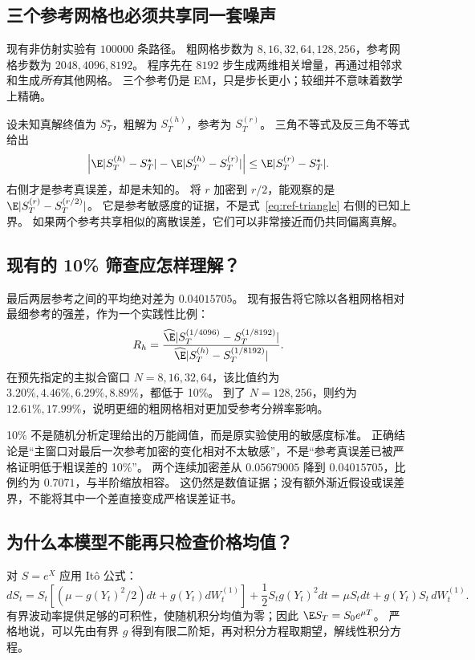 \subsection{三个参考网格也必须共享同一套噪声}
现有非仿射实验有 $100000$ 条路径。
粗网格步数为 $8,16,32,64,128,256$，参考网格步数为 $2048,4096,8192$。
程序先在 $8192$ 步生成两维相关增量，再通过相邻求和生成\emph{所有}其他网格。
三个参考仍是 EM，只是步长更小；较细并不意味着数学上精确。

设未知真解终值为 $S_T^\star$，粗解为 $S_T^{(h)}$，参考为 $S_T^{(r)}$。
三角不等式及反三角不等式给出
\begin{equation}\label{eq:ref-triangle}
 \left|\E|S_T^{(h)}-S_T^\star|-\E|S_T^{(h)}-S_T^{(r)}|\right|
 \le\E|S_T^{(r)}-S_T^\star|.
\end{equation}
右侧才是参考真误差，却是未知的。
将 $r$ 加密到 $r/2$，能观察的是 $\E|S_T^{(r)}-S_T^{(r/2)}|$。
它是参考敏感度的证据，不是式~\eqref{eq:ref-triangle} 右侧的已知上界。
如果两个参考共享相似的离散误差，它们可以非常接近而仍共同偏离真解。

\subsection{现有的 10\% 筛查应怎样理解？}
最后两层参考之间的平均绝对差为 $0.04015705$。
现有报告将它除以各粗网格相对最细参考的强差，作为一个实践性比例：
\begin{equation}\label{eq:ref-screen}
 R_h=\frac{\widehat\E|S_T^{(1/4096)}-S_T^{(1/8192)}|}
 {\widehat\E|S_T^{(h)}-S_T^{(1/8192)}|}.
\end{equation}
在预先指定的主拟合窗口 $N=8,16,32,64$，该比值约为 $3.20\%,4.46\%,6.29\%,8.89\%$，都低于 10\%。
到了 $N=128,256$，则约为 $12.61\%,17.99\%$，说明更细的粗网格相对更加受参考分辨率影响。

10\% 不是随机分析定理给出的万能阈值，而是原实验使用的敏感度标准。
正确结论是“主窗口对最后一次参考加密的变化相对不太敏感”，不是“参考真误差已被严格证明低于粗误差的 10\%”。
两个连续加密差从 $0.05679005$ 降到 $0.04015705$，比例约为 $0.7071$，与半阶缩放相容。
这仍然是数值证据；没有额外渐近假设或误差界，不能将其中一个差直接变成严格误差证书。

\subsection{为什么本模型不能再只检查价格均值？}
对 $S=e^X$ 应用 Itô 公式：
\begin{equation}\label{eq:ref-price-sde}
 dS_t=S_t\left[(\mu-g(Y_t)^2/2)dt+g(Y_t)dW_t^{(1)}\right]
       +\frac12S_tg(Y_t)^2dt
 =\mu S_tdt+g(Y_t)S_t\,dW_t^{(1)}.
\end{equation}
有界波动率提供足够的可积性，使随机积分均值为零；因此 $\E S_T=S_0e^{\mu T}$。
严格地说，可以先由有界 $g$ 得到有限二阶矩，再对积分方程取期望，解线性积分方程。

